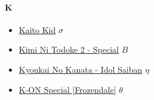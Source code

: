 		\paragraph{K} \hypertarget{SPK}{}
			\begin{itemize}
					\item  \href{https://mega.nz/#F!Vc8jCJrC!XbM2NMyZj_1gaecLaFHSYQ} {Kaito Kid} $\sigma$   \\
					\item  \href{https://mega.nz/#F!cIM30Qia!ngowrp_MK2TRGrCQxRHeJA} {Kimi Ni Todoke 2 - Special} $B$   \\ 
					\item  \href{https://mega.nz/#F!Idc1AK5R!ah2q7akcKsgvDex6iTlRww} {Kyoukai No Kanata - Idol Saiban} $\eta$   \\ 
					\item  \href{https://mega.nz/#F!w1tTmAhb!CsNF9bXy0imEq2VO90zGlA} {K-ON Special [Frozendale]} $\theta$   \\ 
					
			\end{itemize}			
			
